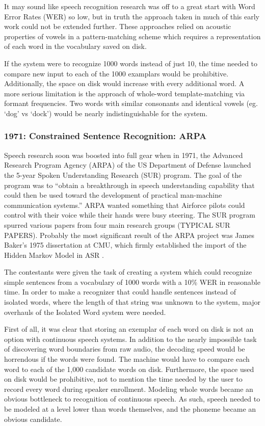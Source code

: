\documentclass[10pt,a4paper]{article}
\begin{document}
It may sound like speech recognition research was off to a great start with Word Error Rates (WER) so low, but in truth the approach taken in much of this early work could not be extended further. These approaches relied on acoustic properties of vowels in a pattern-matching scheme which requires a representation of each word in the vocabulary saved on disk.

If the system were to recognize 1000 words instead of just 10, the time needed to compare new input to each of the 1000 examplars would be prohibitive. Additionally, the space on disk would increase with every additional word. A more serious limitation is the approach of whole-word template-matching via formant frequencies. Two words with similar consonants and identical vowels (eg. `dog' vs `dock') would be nearly indistinguishable for the system.

\subsubsection{1971: Constrained Sentence Recognition: ARPA}

 Speech research soon was boosted into full gear when in 1971, the Advanced Research Program Agency (ARPA) of the US Department of Defense launched the 5-year Spoken Understanding Research (SUR) program. The goal of the program was to ``obtain a breakthrough in speech understanding capability that could then be used toward the development of practical man-machine communication systems.'' \cite{klatt1977} ARPA wanted something that Airforce pilots could control with their voice while their hands were busy steering. The SUR program spurred various papers from four main research groups (TYPICAL SUR PAPERS). Probably the most significant result of the ARPA project was James Baker's 1975 dissertation at CMU, which firmly established the import of the Hidden Markov Model in ASR \cite{bakerDissertation1975}.


 The contestants were given the task of creating a system which could recognize simple sentences from a vocabulary of 1000 words with a 10\% WER in reasonable time. In order to make a recognizer that could handle sentences instead of isolated words, where the length of that string was unknown to the system, major overhauls of the Isolated Word system were needed.

First of all, it was clear that storing an exemplar of each word on disk is not an option with continuous speech systems. In addition to the nearly impossible task of discovering word boundaries from raw audio, the decoding speed would be horrendous if the words were found. The machine would have to compare each word to each of the 1,000 candidate words on disk. Furthermore, the space used on disk would be prohibitive, not to mention the time needed by the user to record every word during speaker enrollment. Modeling whole words became an obvious bottleneck to recognition of continuous speech. As such, speech needed to be modeled at a level lower than words themselves, and the phoneme became an obvious candidate.
\end{document}
